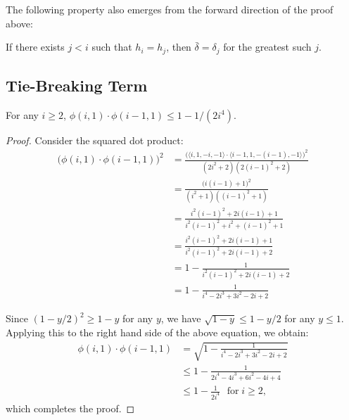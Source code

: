 The following property also emerges from the forward direction of the proof above:

\begin{lemma} \label{lem:ranked-rightmost}
    If there exists $j < i$ such that $h_i = h_j$, then $\bar \delta = \delta_j$ for the greatest such $j$.
\end{lemma}

\subsection{Tie-Breaking Term} \label{sec:tie-breaking}


\begin{lemma} \label{lem:inexact-error}
    For any $i \geq 2$, $\phi(i, 1) \cdot \phi(i-1, 1) \leq 1 - 1/(2 i^4)$.
\end{lemma}

\begin{proof}
    Consider the squared dot product:
    \begin{align*}
        \big( \phi(i, 1) \cdot \phi(i-1, 1) \big)^2
        & = \frac{\big( \langle i, 1, -i, -1 \rangle \cdot \langle i-1, 1, -(i-1), -1 \rangle \big)^2}{(2i^2 + 2) (2(i-1)^2 + 2)} \\
        & = \frac{ \big( i(i-1) + 1 \big)^2 }{(i^2 + 1) ((i-1)^2 + 1)}  \\
        & = \frac{i^2(i-1)^2 + 2i(i-1) + 1}{i^2(i-1)^2 + i^2 + (i-1)^2 + 1} \\
        & = \frac{i^2(i-1)^2 + 2i(i-1) + 1}{i^2(i-1)^2 + 2i(i-1) + 2} \\
        & = 1 - \frac{1}{i^2(i-1)^2 + 2i(i-1) + 2} \\
        & = 1 - \frac{1}{i^4 - 2i^3 + 3i^2 - 2i + 2}
    \end{align*}

    Since $(1 - y/2)^2 \geq 1-y$ for any $y$, we have $\sqrt{1-y} \leq 1 - y/2$ for any $y \leq 1$. Applying this to the right hand side of the above equation, we obtain:
    \begin{align*}
        \phi(i, 1) \cdot \phi(i-1, 1)
        & = \sqrt{1 - \frac{1}{i^4 - 2i^3 + 3i^2 - 2i + 2}} \\
        & \leq 1 - \frac{1}{2i^4 - 4i^3 + 6i^2 - 4i + 4} \\
        & \leq 1 - \frac{1}{2i^4} \ \ \ \text{for}\; i \geq 2 \text{,}
    \end{align*}
    which completes the proof.
\end{proof}

